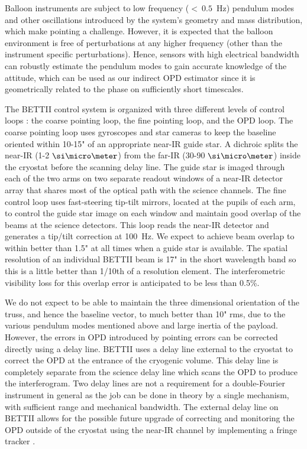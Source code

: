Balloon instruments are subject to low frequency ($<~0.5$~Hz) pendulum modes and other oscillations introduced by the system's geometry and mass distribution, which make pointing a challenge. However, it is expected that the balloon environment is free of perturbations at any higher frequency (other than the instrument specific perturbations). Hence, sensors with high electrical bandwidth can robustly estimate the pendulum modes to gain accurate knowledge of the attitude, which can be used as our indirect OPD estimator since it is geometrically related to the phase on sufficiently short timescales.

The BETTII control system is organized with three different levels of control loops \citep{Rizzo:2014jq}: the coarse pointing loop, the fine pointing loop, and the OPD loop. The coarse pointing loop uses gyroscopes and star cameras to keep the baseline oriented within 10-15" of an appropriate near-IR guide star. A dichroic splits the near-IR (1-2$~\um$) from the far-IR (30-90$~\um$) inside the cryostat before the scanning delay line. The guide star is imaged through each of the two arms on two separate readout windows of a near-IR detector array that shares most of the optical path with the science channels. The fine control loop uses fast-steering tip-tilt mirrors, located at the pupils of each arm, to control the guide star image on each window and maintain good overlap of the beams at the science detectors. This loop reads the near-IR detector and generates a tip/tilt correction at 100~Hz. We expect to achieve beam overlap to within better than 1.5" at all times when a guide star is available. The spatial resolution of an individual BETTII beam
is 17" in the short wavelength band so this is a little better than 1/10th of a resolution element. The interferometric visibility loss
for this overlap error is anticipated to be less than 0.5\%.

We do not expect to be able to maintain the three dimensional orientation of the truss, and hence the baseline
vector, to much better than 10" rms, due to the various pendulum modes mentioned above and large inertia of the payload.
However, the errors in OPD introduced by pointing errors can be corrected directly using a delay line. BETTII uses a delay line external to the cryostat to correct the OPD at the entrance of the cryogenic volume. This delay line is completely separate from the science delay line which scans the OPD to produce the interferogram. Two delay lines are not a requirement for a double-Fourier instrument in general as the job can be done in theory by a single mechanism, with sufficient range and mechanical bandwidth. The external delay line on BETTII allows for the possible future upgrade
of correcting and monitoring the OPD outside of the cryostat using the near-IR channel by implementing a fringe tracker \citep{Rizzo:2012jp}.

